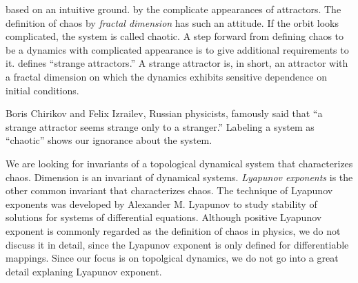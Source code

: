 \documentclass[10pt,twoside,draft]{book}
\begin{document}
based on an intuitive ground.
by the complicate appearances of attractors.
The definition of chaos by \textit{fractal dimension} has such an attitude.
If the orbit looks complicated, the system is called chaotic.
A step forward from defining chaos to be a dynamics with complicated appearance is to give additional requirements to it.
\citet{ruelle} defines ``strange attractors.'' 
A strange attractor is, in short, an attractor with a fractal dimension on which the dynamics exhibits sensitive dependence on initial conditions. \citep[p.11]{ott1994}

Boris Chirikov and Felix Izrailev, Russian physicists, famously said that ``a strange attractor seems strange only to a stranger.'' \citep{lorentzbook}
Labeling a system as ``chaotic'' shows our ignorance about the system.


We are looking for invariants of a topological dynamical system that characterizes chaos.
Dimension is an invariant of dynamical systems.
\textit{Lyapunov exponents} is the other common invariant that characterizes chaos.
The technique of Lyapunov exponents was developed by Alexander M. Lyapunov to study stability of solutions for systems of differential equations.
Although positive Lyapunov exponent is commonly regarded as the definition of chaos \citep{kantz-schreiber} in physics, we do not discuss it in detail, since the Lyapunov exponent is only defined for differentiable mappings.
Since our focus is on topolgical dynamics, we do not go into a great detail explaning Lyapunov exponent.
\end{document}
